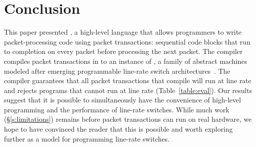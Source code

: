\section{Conclusion}
\label{s:conclusion}

This paper presented \pktlanguage, a high-level language that allows
programmers to write packet-processing code using packet transactions:
sequential code blocks that run to completion on every packet before processing
the next packet. The \pktlanguage compiler compiles packet transactions in
\pktlanguage to an instance of \absmachine, a family of abstract machines
modeled after emerging programmable line-rate switch
architectures~\cite{flexpipe, xpliant, rmt}. The compiler guarantees that all
packet transactions that compile will run at line rate and rejects \pktlanguage
programs that cannot run at line rate (Table~\ref{table:eval}). Our results
suggest that it is possible to simultaneously have the convenience of
high-level programming and the performance of line-rate switches. While much
work (\S\ref{s:limitations}) remains before packet transactions can run on real
hardware, we hope to have convinced the reader that this is possible and worth
exploring further as a model for programming line-rate switches.

